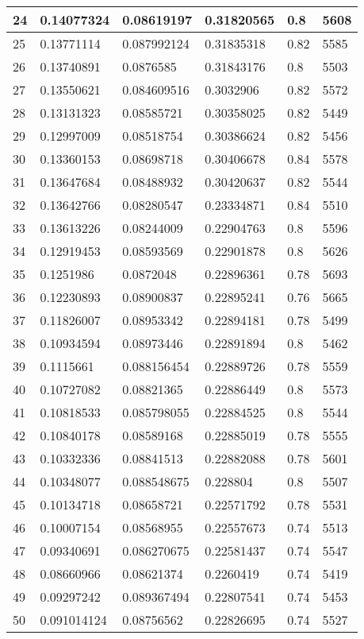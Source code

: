 \begin{longtable}{|l|l|l|l|l|l|}
24 & 0.14077324 & 0.08619197 & 0.31820565 & 0.8 & 5608 \\ \hline 
25 & 0.13771114 & 0.087992124 & 0.31835318 & 0.82 & 5585 \\ \hline 
26 & 0.13740891 & 0.0876585 & 0.31843176 & 0.8 & 5503 \\ \hline 
27 & 0.13550621 & 0.084609516 & 0.3032906 & 0.82 & 5572 \\ \hline 
28 & 0.13131323 & 0.08585721 & 0.30358025 & 0.82 & 5449 \\ \hline 
29 & 0.12997009 & 0.08518754 & 0.30386624 & 0.82 & 5456 \\ \hline 
30 & 0.13360153 & 0.08698718 & 0.30406678 & 0.84 & 5578 \\ \hline 
31 & 0.13647684 & 0.08488932 & 0.30420637 & 0.82 & 5544 \\ \hline 
32 & 0.13642766 & 0.08280547 & 0.23334871 & 0.84 & 5510 \\ \hline 
33 & 0.13613226 & 0.08244009 & 0.22904763 & 0.8 & 5596 \\ \hline 
34 & 0.12919453 & 0.08593569 & 0.22901878 & 0.8 & 5626 \\ \hline 
35 & 0.1251986 & 0.0872048 & 0.22896361 & 0.78 & 5693 \\ \hline 
36 & 0.12230893 & 0.08900837 & 0.22895241 & 0.76 & 5665 \\ \hline 
37 & 0.11826007 & 0.08953342 & 0.22894181 & 0.78 & 5499 \\ \hline 
38 & 0.10934594 & 0.08973446 & 0.22891894 & 0.8 & 5462 \\ \hline 
39 & 0.1115661 & 0.088156454 & 0.22889726 & 0.78 & 5559 \\ \hline 
40 & 0.10727082 & 0.08821365 & 0.22886449 & 0.8 & 5573 \\ \hline 
41 & 0.10818533 & 0.085798055 & 0.22884525 & 0.8 & 5544 \\ \hline 
42 & 0.10840178 & 0.08589168 & 0.22885019 & 0.78 & 5555 \\ \hline 
43 & 0.10332336 & 0.08841513 & 0.22882088 & 0.78 & 5601 \\ \hline 
44 & 0.10348077 & 0.088548675 & 0.228804 & 0.8 & 5507 \\ \hline 
45 & 0.10134718 & 0.08658721 & 0.22571792 & 0.78 & 5531 \\ \hline 
46 & 0.10007154 & 0.08568955 & 0.22557673 & 0.74 & 5513 \\ \hline 
47 & 0.09340691 & 0.086270675 & 0.22581437 & 0.74 & 5547 \\ \hline 
48 & 0.08660966 & 0.08621374 & 0.2260419 & 0.74 & 5419 \\ \hline 
49 & 0.09297242 & 0.089367494 & 0.22807541 & 0.74 & 5453 \\ \hline 
50 & 0.091014124 & 0.08756562 & 0.22826695 & 0.74 & 5527 \\ \hline 
\end{longtable}